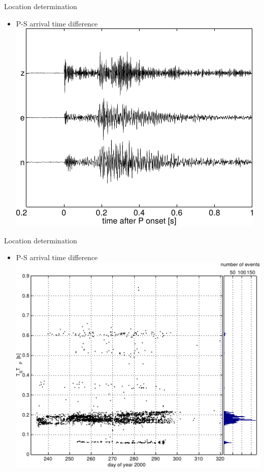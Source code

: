 \documentclass[14pt]{beamer}
\begin{document}
\begin{frame}{Location determination}
    \pause
 \begin{itemize}
  \item P-S arrival time difference
   \\ \includegraphics[scale=1]{img/PilotSonde_rawData.pdf}
 \end{itemize}
\end{frame}

\begin{frame}{Location determination}
 \begin{itemize}
  \item P-S arrival time difference
   \\ \includegraphics[scale=1]{img/PilotSonde_eventHisto.pdf}
 \end{itemize}
\end{frame}
\end{document}
